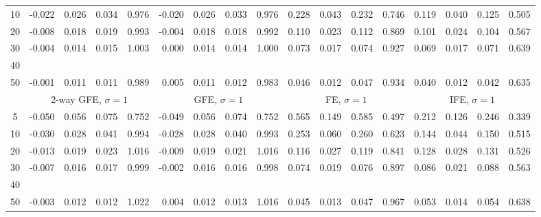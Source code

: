 \documentclass{article}
\begin{document}
\begin{tabular}{c r r r r r r r r r r r r r r r r}
10 &     -0.022 &      0.026 &      0.034 &      0.976 &     -0.020 &      0.026 &      0.033 &      0.976 &      0.228 &      0.043 &      0.232 &      0.746 &      0.119 &      0.040 &      0.125 &      0.505\\
20 &     -0.008 &      0.018 &      0.019 &      0.993 &     -0.004 &      0.018 &      0.018 &      0.992 &      0.110 &      0.023 &      0.112 &      0.869 &      0.101 &      0.024 &      0.104 &      0.567\\
30 &     -0.004 &      0.014 &      0.015 &      1.003 &      0.000 &      0.014 &      0.014 &      1.000 &      0.073 &      0.017 &      0.074 &      0.927 &      0.069 &      0.017 &      0.071 &      0.639\\
40\\
50 &     -0.001 &      0.011 &      0.011 &      0.989 &      0.005 &      0.011 &      0.012 &      0.983 &      0.046 &      0.012 &      0.047 &      0.934 &      0.040 &      0.012 &      0.042 &      0.635\\[0pt]
 & \multicolumn{ 4 }{c}{ 2-way GFE, $\sigma{=}1$} & \multicolumn{ 4 }{c}{ GFE, $\sigma{=}1$} & \multicolumn{ 4 }{c}{ FE, $\sigma{=}1$} & \multicolumn{ 4 }{c}{ IFE, $\sigma{=}1$}\\[-3pt]
 \cmidrule(lr){2-5}  \cmidrule(lr){6-9}  \cmidrule(lr){10-13}  \cmidrule(lr){14-17}
5 &     -0.050 &      0.056 &      0.075 &      0.752 &     -0.049 &      0.056 &      0.074 &      0.752 &      0.565 &      0.149 &      0.585 &      0.497 &      0.212 &      0.126 &      0.246 &      0.339\\
10 &     -0.030 &      0.028 &      0.041 &      0.994 &     -0.028 &      0.028 &      0.040 &      0.993 &      0.253 &      0.060 &      0.260 &      0.623 &      0.144 &      0.044 &      0.150 &      0.515\\
20 &     -0.013 &      0.019 &      0.023 &      1.016 &     -0.009 &      0.019 &      0.021 &      1.016 &      0.116 &      0.027 &      0.119 &      0.841 &      0.128 &      0.028 &      0.131 &      0.526\\
30 &     -0.007 &      0.016 &      0.017 &      0.999 &     -0.002 &      0.016 &      0.016 &      0.998 &      0.074 &      0.019 &      0.076 &      0.897 &      0.086 &      0.021 &      0.088 &      0.563\\
40\\
50 &     -0.003 &      0.012 &      0.012 &      1.022 &      0.004 &      0.012 &      0.013 &      1.016 &      0.045 &      0.013 &      0.047 &      0.967 &      0.053 &      0.014 &      0.054 &      0.638\\[0pt]

\end{tabular}
\end{document}
